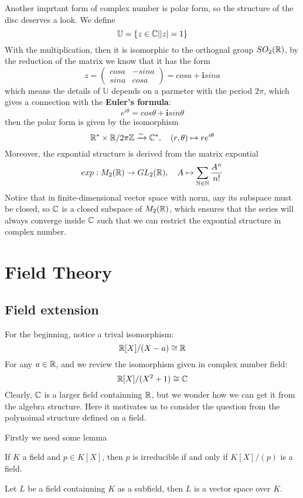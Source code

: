 \documentclass[en,geye,blue,normal,12pt]{elegantnote}
\begin{document}
Another imprtant form of complex number is polar form, so the structure of the disc deserves a look. We define
\[\mathbb{U} = \{z\in \mathbb{C} | |z| = 1 \}\]
With the multiplication, then it is isomorphic to the orthognal group \(SO_2(\mathbb{R})\), by the reduction of the matrix we know that it has the form
\[z = \begin{pmatrix}
  cosa & -sina \\
  sina & cosa 
\end{pmatrix}= cosa + \mathbf{i}sina\]
which means the details of \(\mathbb{U}\) depends on a parmeter with the period \(2 \pi\), which gives a connection with the \textbf{Euler's formula}:
\[e^{i \theta} = cos\theta + \mathbf{i} sin\theta\]
then the polar form is given by the isomorphism
\[\mathbb{R}^* \times \mathbb{R}/ 2\pi \mathbb{Z}  \xrightarrow{\sim} \mathbb{C}^*, \quad (r,\theta) \mapsto re^{i\theta}
\]
Moreover, the expontial structure is derived from the matrix expontial
\[exp: M_2(\mathbb{R}) \to GL_2(\mathbb{R}), \quad A \mapsto \sum_{\mathbb{N} \in \mathbb{N}} \frac{A^n}{n!}\]
Notice that in finite-dimensional vector space with norm, any its subspace must be closed, so \(\mathbb{C}\) is a closed subspace of \(M_2(\mathbb{R})\), which ensures that the series will always converge inside \(\mathbb{C}\) such that we can restrict the expontial structure in complex number.

\section{Field Theory}
\subsection{Field extension}
For the beginning, notice a trival isomorphism:
\[\mathbb{R}[X]/(X-a) \cong \mathbb{R} \]
For any \(a \in \mathbb{R}\), and we review the isomorphism given in complex number field:
\[ \mathbb{R}[X]/ (X^2+1) \cong \mathbb{C}\]
Clearly, \(\mathbb{C}\) is a larger field containning \(\mathbb{R}\), but we wonder how we can get it from the algebra structure. Here it motivates us to consider the question from the polynoimal structure defined on a field.

Firstly we need some lemma
\begin{lemma} \label{irr iff field}
  If \(K\) a field and \(p \in K[X]\), then \(p\) is irreducible if and only if \(K[X]/(p)\) is a field.
\end{lemma}

\begin{lemma}
  Let \(L\) be a field containning \(K\) as a subfield, then \(L\) is a vector space over \(K\).
\end{lemma}
\end{document}
